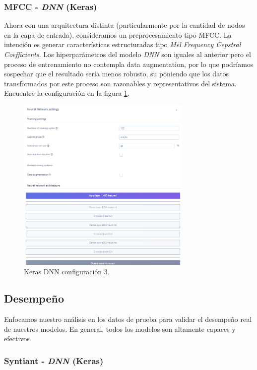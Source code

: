 \documentclass[10pt]{article}
\begin{document}
\subsubsection*{MFCC - \textit{DNN} (Keras)}

Ahora con una arquitectura distinta (particularmente por la cantidad de nodos en la capa de entrada), consideramos un preprocesamiento tipo MFCC. La intención es generar características estructuradas tipo \textit{Mel Frequency Cepstral Coefficients}. Los hiperparámetros del modelo \textit{DNN} son iguales al anterior pero el proceso de entrenamiento no contempla data augmentation, por lo que podríamos sospechar que el resultado sería menos robusto, su poniendo que los datos transformados por este proceso son razonables y representativos del sistema. Encuentre la configuración en la figura \ref{fig:config3}.

\begin{figure}
    \centering
    \includegraphics[width=0.75\textwidth]{MFCC to DNN Config.png}
    \caption{Keras DNN configuración 3.}
    \label{fig:config3}
\end{figure}

\subsection*{Desempeño}

Enfocamos nuestro análisis en los datos de prueba para validar el desempeño real de nuestros modelos. En general, todos los modelos son altamente capaces y efectivos.

\subsubsection*{Syntiant - \textit{DNN} (Keras)}
\end{document}
